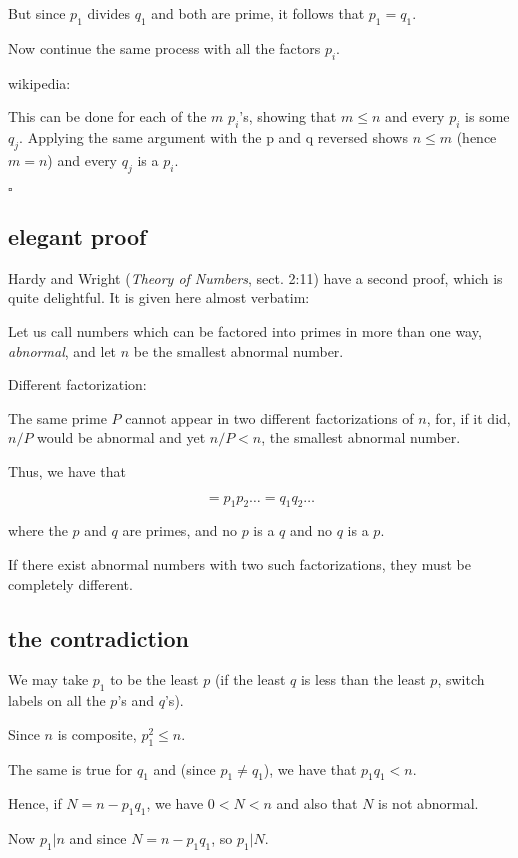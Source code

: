 \documentclass[11pt, oneside]{article}
\begin{document}
But since $p_1$ divides $q_1$ and both are prime, it follows that $p_1 = q_1$. 

Now continue the same process with all the factors $p_i$.

wikipedia:

    This can be done for each of the $m$ $p_i$'s, showing that $m \le n$ and every $p_i$ is some $q_j$. Applying the same argument with the p and q reversed shows $n \le m$ (hence $m = n$) and every $q_j$ is a $p_i$.
    
$\square$
    
\subsection*{elegant proof}

Hardy and Wright (\emph{Theory of Numbers}, sect. 2:11) have a second proof, which is quite delightful.  It is given here almost verbatim:

    Let us call numbers which can be factored into primes in more than one way, \emph{abnormal}, and let $n$ be the smallest abnormal number.

Different factorization:

The same prime $P$ cannot appear in two different factorizations of $n$, for, if it did, $n/P$ would be abnormal and yet $n/P < n$, the smallest abnormal number.

Thus, we have that

\[  = p_1 p_2 \dots = q_1 q_2 \dots \]
    
where the $p$ and $q$ are primes, and no $p$ is a $q$ and no $q$ is a $p$.

If there exist abnormal numbers with two such factorizations, they must be completely different.

\subsection*{the contradiction}

We may take $p_1$ to be the least $p$ (if the least $q$ is less than the least $p$, switch labels on all the $p$'s and $q$'s).  

Since $n$ is composite, $p_1^2 \le n$.

The same is true for $q_1$ and (since $p_1 \ne q_1$), we have that $p_1 q_1 < n$.

Hence, if $N = n - p_1 q_1$, we have $0 < N < n$ and also that $N$ is not abnormal.

Now $p_1 | n$ and since $N = n - p_1 q_1$, so $p_1 | N$.
\end{document}
